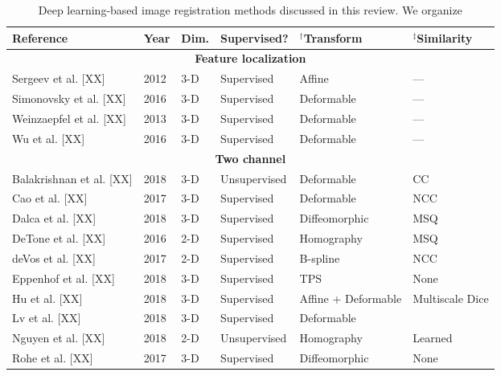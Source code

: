 

\begin{table}[!htb]
\centering
\caption{Deep learning-based image registration methods discussed in this review. We organize}
\label{table:methods}
\begin{tabular*}{\textwidth}{l@{\extracolsep{\fill}}l@{\extracolsep{\fill}}l@{\extracolsep{\fill}}l@{\extracolsep{\fill}}l@{\extracolsep{\fill}}l}
\toprule
\midrule
\textbf{Reference} & \textbf{Year} & \textbf{Dim.} & \textbf{Supervised?} & $^\dagger$\textbf{Transform} & $^\ddagger$\textbf{Similarity} \\
\midrule
\midrule
\multicolumn{6}{c}{\textbf{Feature localization}}
  \vspace{0.25cm} \\
  Sergeev et al. [XX] & 2012 & 3-D & Supervised & Affine & --- \\
  Simonovsky et al. [XX] & 2016 & 3-D & Supervised & Deformable & --- \\
  Weinzaepfel et al. [XX] & 2013 & 3-D & Supervised & Deformable & --- \\
  Wu et al. [XX] & 2016 & 3-D & Supervised & Deformable & --- \\
\midrule
\multicolumn{6}{c}{\textbf{Two channel}}
  \vspace{0.25cm} \\
  Balakrishnan et al. [XX] & 2018 & 3-D & Unsupervised & Deformable & CC \\
  Cao et al. [XX] & 2017 & 3-D & Supervised & Deformable & NCC \\
  Dalca et al. [XX] & 2018 & 3-D & Supervised & Diffeomorphic & MSQ \\
  DeTone et al. [XX] & 2016 & 2-D & Supervised & Homography & MSQ \\
  deVos et al. [XX] & 2017 & 2-D & Supervised & B-spline & NCC \\
  Eppenhof et al. [XX] & 2018 & 3-D & Supervised & TPS & None \\       %
  Hu et al. [XX] & 2018 & 3-D & Supervised & Affine + Deformable & Multiscale Dice \\
  Lv et al. [XX] & 2018 & 3-D & Supervised & Deformable & {} \\
  Nguyen et al. [XX] & 2018 & 2-D & Unsupervised & Homography & Learned \\
  Rohe et al. [XX] & 2017 & 3-D & Supervised & Diffeomorphic & None \\  %

\end{tabular*}
\end{table}
